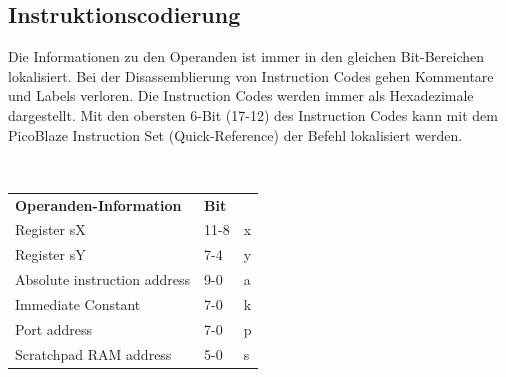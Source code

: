 \subsection{Instruktionscodierung}
\begin{minipage}{9cm}
	Die Informationen zu den Operanden ist immer in den gleichen Bit-Bereichen lokalisiert. Bei der Disassemblierung von Instruction Codes gehen Kommentare und Labels verloren. Die Instruction Codes werden immer als Hexadezimale dargestellt. Mit den obersten 6-Bit (17-12) des Instruction Codes kann mit dem PicoBlaze Instruction Set (Quick-Reference) der Befehl lokalisiert werden.
\end{minipage}
%
\begin{minipage}{0.5cm}
	\ \
\end{minipage}
%
\begin{minipage}{9cm}
		\begin{tabular}{|l|l|l}
			\cline{1-2}
			\rowcolor[HTML]{C0C0C0} 
			\textbf{Operanden-Information} & \textbf{Bit}        & \cellcolor[HTML]{FFFFFF}{\color[HTML]{FFFFFF} \textbf{}} \\ \cline{1-2}
			Register sX                    & 11-8                        & \cellcolor[HTML]{F8FF00}x                                \\ \cline{1-2}
			Register sY                    & 7-4                         & \cellcolor[HTML]{34FF34}y                                \\ \cline{1-2}
			Absolute instruction address   & 9-0                         & \cellcolor[HTML]{34CDF9}a                                \\ \cline{1-2}
			Immediate Constant             & 7-0 						& \cellcolor[HTML]{F8A102}k                                \\ \cline{1-2}
			Port address                   & 7-0                         & \cellcolor[HTML]{FF00A9}p                                \\ \cline{1-2}
			Scratchpad RAM address         & 5-0                         & \cellcolor[HTML]{9B9B9B}s                                \\ \cline{1-2}
		\end{tabular}
\end{minipage}

